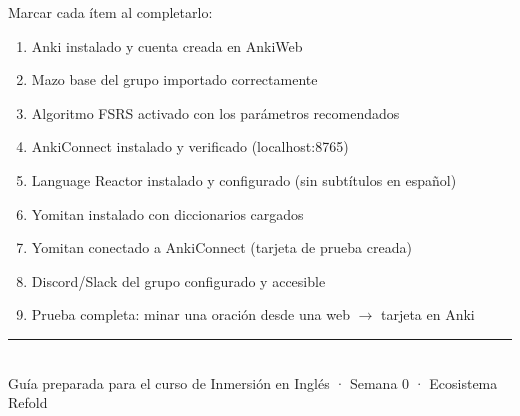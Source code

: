 \documentclass[12pt,a4paper]{article}
\begin{document}
\begin{cajaexito}
Marcar cada ítem al completarlo:

\begin{enumerate}[leftmargin=1.2cm, label=$\square$]
  \item Anki instalado y cuenta creada en AnkiWeb
  \item Mazo base del grupo importado correctamente
  \item Algoritmo FSRS activado con los parámetros recomendados
  \item AnkiConnect instalado y verificado (localhost:8765)
  \item Language Reactor instalado y configurado (sin subtítulos en español)
  \item Yomitan instalado con diccionarios cargados
  \item Yomitan conectado a AnkiConnect (tarjeta de prueba creada)
  \item Discord/Slack del grupo configurado y accesible
  \item Prueba completa: minar una oración desde una web $\rightarrow$ tarjeta en Anki
\end{enumerate}
\end{cajaexito}

\vfill
\begin{center}
\rule{0.5\textwidth}{0.5pt}\\[0.3cm]
{\small\color{grissuave} Guía preparada para el curso de Inmersión en Inglés · Semana 0 · Ecosistema Refold}
\end{center}
\end{document}

